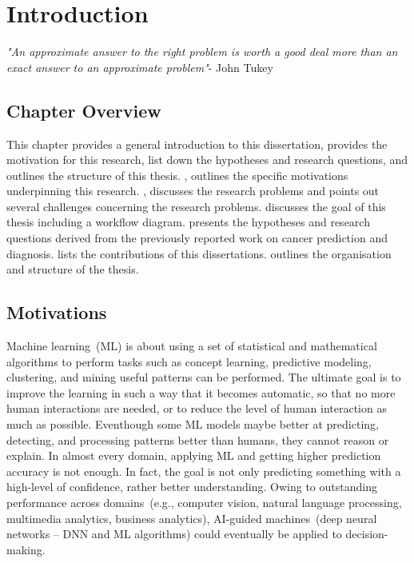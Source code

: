 \chapter{Introduction}
\label{chapter:introduction}
\textit{"An approximate answer to the right problem is worth a good deal more than an exact answer to an approximate problem"}- John Tukey

\section{Chapter Overview}
This chapter provides a general introduction to this dissertation, provides the motivation for this research, list down the hypotheses and research questions, and outlines the structure of this thesis. 
, outlines the specific motivations underpinning this research. , discusses the research problems and points out several challenges concerning the research problems.  discusses the goal of this thesis including a workflow diagram.  presents the hypotheses and research questions derived from the previously reported work on cancer prediction and diagnosis.  lists the contributions of this dissertations.  outlines the organisation and structure of the thesis.

\section{Motivations}\label{motivations}
Machine learning~(ML) is about using a set of statistical and mathematical algorithms to perform tasks such as concept learning, predictive modeling, clustering, and mining useful patterns can be performed. The ultimate goal is to improve the learning in such a way that it becomes automatic, so that no more human interactions are needed, or to reduce the level of human interaction as much as possible. Eventhough some ML models maybe better at predicting, detecting, and processing patterns better than humans, they cannot reason or explain. In almost every domain, applying ML and getting higher prediction accuracy is not enough. In fact, the goal is not only predicting something with a high-level of confidence, rather better understanding. Owing to outstanding performance across domains~(e.g., computer vision, natural language processing, multimedia analytics, business analytics), AI-guided machines~(deep neural networks -- DNN and ML algorithms) could eventually be applied to decision-making. 

